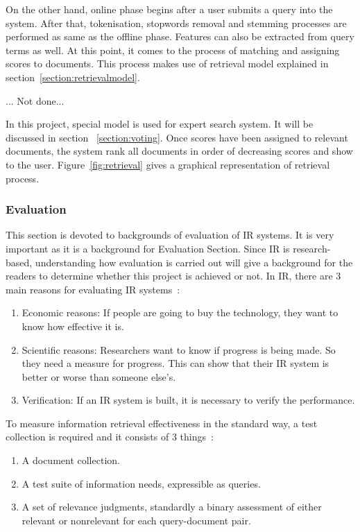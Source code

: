 
On the other hand, online phase begins after a user submits a query into the system. After that, tokenisation, stopwords removal and stemming processes 
are performed as same as the offline phase.
Features can also be extracted from query terms as well. At this point, it comes to the process of matching and assigning scores to documents.
This process makes use of retrieval model explained in section~\ref{section:retrievalmodel}.


... Not done... 


In this project, special model is used for expert search system. It will be discussed
in section ~\ref{section:voting}. Once scores have been assigned to relevant documents, the system rank all documents in order of decreasing scores and 
show to the user. Figure~\ref{fig:retrieval} gives a graphical representation of retrieval process.

\subsubsection{Evaluation}\label{sec:evaluation}
This section is devoted to backgrounds of evaluation of IR systems. It is very important as it is a background for Evaluation Section. 
Since IR is research-based, understanding how evaluation is carried out will give a background for the readers to determine whether 
this project is achieved or not. In IR, there are 3 main reasons for evaluating IR systems~\cite[P. 3]{eval}: 
\begin{enumerate}
 \item Economic reasons: If people are going to buy the technology, they want to know how effective it is.
 \item Scientific reasons: Researchers want to know if progress is being made. So they need a measure for progress. 
	This can show that their IR system is better or worse than someone else's.
 \item Verification: If an IR system is built, it is necessary to verify the performance.
\end{enumerate}

To measure information retrieval effectiveness in the standard way, a test collection is required and it consists of 3 things~\cite{evalweb}:
\begin{enumerate}
 \item A document collection.
 \item A test suite of information needs, expressible as queries.
 \item A set of relevance judgments, standardly a binary assessment of either relevant or nonrelevant for each query-document pair.
\end{enumerate}

